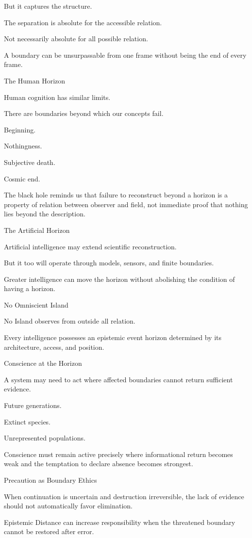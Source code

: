 But it captures the structure.

The separation is absolute for the accessible relation.

Not necessarily absolute for all possible relation.

A boundary can be unsurpassable from one frame without being the end of every frame.

The Human Horizon

Human cognition has similar limits.

There are boundaries beyond which our concepts fail.

Beginning.

Nothingness.

Subjective death.

Cosmic end.

The black hole reminds us that failure to reconstruct beyond a horizon is a property of relation between observer and field, not immediate proof that nothing lies beyond the description.

The Artificial Horizon

Artificial intelligence may extend scientific reconstruction.

But it too will operate through models, sensors, and finite boundaries.

Greater intelligence can move the horizon without abolishing the condition of having a horizon.

No Omniscient Island

No Island observes from outside all relation.

Every intelligence possesses an epistemic event horizon determined by its architecture, access, and position.

Conscience at the Horizon

A system may need to act where affected boundaries cannot return sufficient evidence.

Future generations.

Extinct species.

Unrepresented populations.

Conscience must remain active precisely where informational return becomes weak and the temptation to declare absence becomes strongest.

Precaution as Boundary Ethics

When continuation is uncertain and destruction irreversible, the lack of evidence should not automatically favor elimination.

Epistemic Distance can increase responsibility when the threatened boundary cannot be restored after error.

